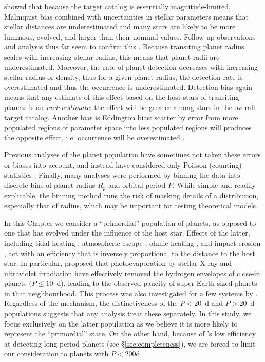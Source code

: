 \citet{GaidosMann2013} showed that because the \kep{} target catalog
is essentially magnitude-limited, Malmquist bias combined with
uncertainties in stellar parameters means that stellar distances are
underestimated and many stars are likely to be more luminous, evolved,
and larger than their nominal values.  Follow-up observations and
analysis thus far seem to confirm this
\citep[e.g.][]{Bastien2014,Everett2013,Verner2011}.  Because
transiting planet radius scales with increasing stellar radius, this means that
planet radii are underestimated.  Moreover, the rate of planet
detection decreases with increasing stellar radius or density, thus
for a given planet radius, the detection rate is overestimated and
thus the occurrence is underestimated.  Detection bias again means
that any estimate of this effect based on the host stars of transiting
planets is an {\it underestimate}: the effect will be greater among
stars in the overall target catalog.  Another bias is Eddington bias:
scatter by error from more populated regions of parameter space into
less populated regions will produces the opposite effect,
i.e. occurrence will be overestimated \citep{GaidosMann2013}.

Previous analyses of the \kep{} planet population have sometimes not taken
these errors or biases into account, and instead have considered only
Poisson (counting) statistics \citep[e.g.][]{Petigura2013,Howard2012}.
Finally, many analyses
were performed by binning the data into discrete bins of planet radius $R_p$
and orbital period $P$.  While simple and readily explicable, the binning
method runs the risk of masking details of a distribution, especially
that of radius, which may be important for testing theoretical
models.

In this Chapter we consider a ``primordial'' population of
planets, as opposed to one that has evolved under the influence of the
host star. Effects of the latter, including tidal heating
\citep{Jackson2008}, atmospheric escape \citep{Tian2005}, ohmic heating
\citep{Batygin2011}, and impact erosion \citep{Marcus2009}, act with
an efficiency that is inversely proportional to the distance to the
host star. In particular, \citet{Owen2013} proposed that
photoevaporation by stellar X-ray and ultraviolet irradiation have effectively removed
the hydrogen envelopes of close-in planets ($P \leq 10$~d), leading
to the observed paucity of super-Earth sized planets in that
neighbourhood.  This process was also investigated for a few \kep{}
systems by \citet{Lopez2012}. Regardless of the mechanism, the
distinctiveness of the $P< 20$~d and $P>20$~d populations \citep[see,
e.g.][]{Youdin} suggests that any analysis treat these separately.  In
this study, we focus exclusively on the latter population as we
believe it is more likely to represent the ``primordial'' state.  On
the other hand, because of \kep{}'s low efficiency at detecting
long-period planets (see \S \ref{sec:completeness}), we are forced to
limit our consideration to planets with $P<200$d.

